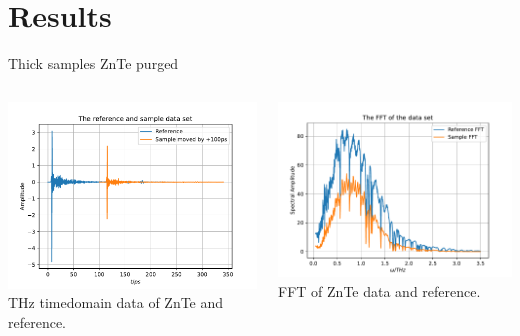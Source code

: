 \documentclass[aspectratio=1610, 9pt]{beamer}
\begin{document}
\section{Results}
\begin{frame}{Thick samples}
  ZnTe purged
  \begin{columns}
    \begin{column}{0.5\textwidth}
      \includegraphics[width=\textwidth]{images/ZnTe1mm_purged_nofilter/THz_timedomain.pdf}
      {THz timedomain data of ZnTe and reference.}
    \end{column}
    \begin{column}{0.5\textwidth}
      \includegraphics[width=\textwidth]{images/ZnTe1mm_purged_nofilter/THz_FFT.pdf}
      {FFT of ZnTe data and reference.}
    \end{column}
  \end{columns}
\end{frame}
\end{document}
